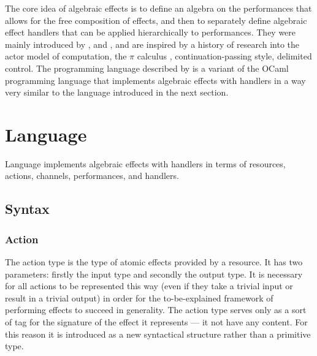 The core idea of algebraic effects is to define an algebra on the performances that allows for the free composition of effects, and then to separately define algebraic effect handlers that can be applied hierarchically to performances.
They were mainly introduced by \cite{Plotkin200101}, \cite{Plotkin2009} and \cite{Bauer2013},
and are inspired by a history of research into the actor model of computation, the $\pi$ calculus \cite{Milner1999}, continuation-passing style, delimited control.
The  programming language described by \cite{Bauer2015ProgrammingWA} is a variant of the OCaml programming language that implements algebraic effects with handlers in a way very similar to the language \LangD introduced in the next section.

\newpage
\section{Language \LangD}
\label{sec:LangD}

Language \LangD implements algebraic effects with handlers in terms of resources, actions, channels, performances, and handlers.

\subsection{Syntax}



\subsubsection{Action}

The action type is the type of atomic effects provided by a resource.
It has two parameters: firstly the input type and secondly the output type.
It is necessary for all actions to be represented this way
(even if they take a trivial input or result in a trivial output)
in order for the to-be-explained framework of performing effects to succeed in generality.
The action type serves only as a sort of tag for the signature of the effect it represents --- it not have any content.
For this reason it is introduced as a new syntactical structure rather than a primitive type.

